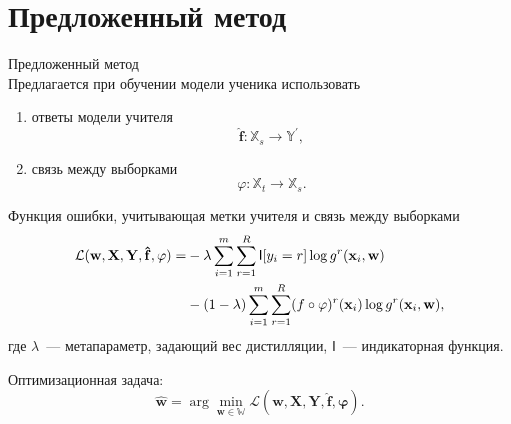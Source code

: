 \documentclass[10pt,pdf,hyperref={unicode}]{beamer}
\begin{document}
\section{Предложенный метод}
\begin{frame}{Предложенный метод}
~\\[-1mm]
Предлагается при обучении модели ученика использовать
\begin{enumerate}[1)]
	\item ответы модели учителя 
	$$\hat{\mathbf{f}}: \mathbb{X}_{s} \rightarrow \mathbb{Y}^{\prime},$$
	\item связь между выборками
	$$\varphi: \mathbb{X}_{t} \rightarrow \mathbb{X}_{s}.$$
\end{enumerate}

\medskip
Функция ошибки, учитывающая метки учителя и связь между выборками
\[
\setlength\abovedisplayskip{0pt}
\begin{aligned}
    \mathcal{L}(\mathbf{w,X,Y,\hat{f},\varphi})=&-\lambda\sum\limits_{i=1}^{m}\sum\limits_{r=1}^{R}\mathsf{I}[y_{i}=r]\log{g^{r}(\mathbf{x}_{i},\mathbf{w})}\\
    &-(1-\lambda)\sum\limits_{i=1}^{m}\sum\limits_{r=1}^{R}(f\circ \varphi)^{r}(\mathbf{x}_{i})\log{g^{r}(\mathbf{x}_{i},\mathbf{w})},
\end{aligned}
\setlength\belowdisplayskip{0pt}
\]
где $\lambda$~--- метапараметр, задающий вес дистилляции, $\mathsf{I}$~--- индикаторная функция.

Оптимизационная задача:
\[
\hat{\mathbf{w}} = \arg\min_{\mathbf{w} \in \mathbb{W}} \mathcal{L}(\mathbf{w,X,Y,\hat{f},\varphi}).
\]

\end{frame}

\end{document}
